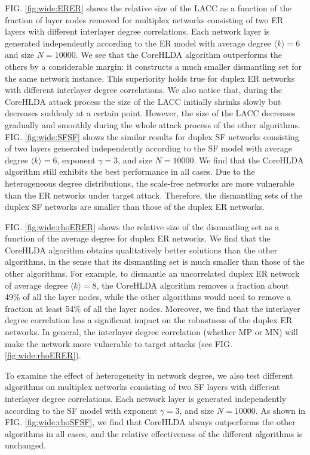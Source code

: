 \documentclass[%
 aip,
 cha,
 amsmath,amssymb,
 reprint,%
]{revtex4-1}
\begin{document}
FIG. \ref{fig:wide:ERER} shows the relative size of the LACC as a function of the fraction of layer nodes removed for multiplex networks consisting of two ER layers with different interlayer degree correlations. Each network layer is generated independently according to the ER model with average degree $\langle k\rangle =6$ and size $N=10000$. We see that the CoreHLDA algorithm outperforms the others by a considerable margin: it constructs a much smaller dismantling set for the same network instance. This superiority holds true for duplex ER networks with different interlayer degree correlations. We also notice that, during the CoreHLDA attack process the size of the LACC initially shrinks slowly but decreases suddenly at a certain point. However, the size of the LACC decreases gradually and smoothly during the whole attack process of the other algorithms. FIG. \ref{fig:wide:SFSF} shows the similar results for duplex SF networks consisting of two layers generated independently according to the SF model with average degree $\langle k\rangle = 6$, exponent $\gamma = 3$, and size $N=10000$. We find that the CoreHLDA algorithm still exhibits the best performance in all cases. Due to the heterogeneous degree distributions, the scale-free networks are more vulnerable than the ER networks under target attack. Therefore, the dismantling sets of the duplex SF networks are smaller than those of the duplex ER networks.

FIG. \ref{fig:wide:rhoERER} shows the relative size of the dismantling set as a function of the average degree for duplex ER networks. We find that the CoreHLDA algorithm obtains qualitatively better solutions than the other algorithms, in the sense that its dismantling set is much smaller than those of the other algorithms. For example, to dismantle an uncorrelated duplex ER network of average degree $\langle k\rangle =8$, the CoreHLDA algorithm removes a fraction about 49\% of all the layer nodes, while the other algorithms would need to remove a fraction at least 54\% of all the layer nodes. Moreover, we find that the interlayer degree correlation has a significant impact on the robustness of the duplex ER networks. In general, the interlayer degree correlation (whether MP or MN) will make the network more vulnerable to target attacks (see FIG. \ref{fig:wide:rhoERER}).

To examine the effect of heterogeneity in network degree, we also test different algorithms on multiplex networks consisting of two SF layers with different interlayer degree correlations. Each network layer is generated independently according to the SF model with exponent $\gamma = 3$, and size $N=10000$. As shown in FIG. \ref{fig:wide:rhoSFSF}, we find that CoreHLDA always outperforms the other algorithms in all cases, and the relative effectiveness of the different algorithms is unchanged.
\end{document}
